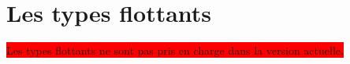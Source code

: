 




\chapter{Les types flottants}

\colorbox{red}{Les types flottants ne sont pas pris en charge dans la version actuelle.}
